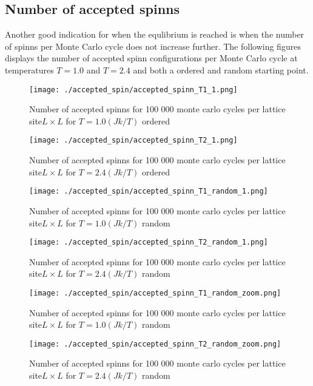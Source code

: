 \documentclass[../main.tex]{subfiles}
\begin{document}
\subsection*{Number of accepted spinns}
Another good indication for when the equlibrium is reached is when the number of spinns per Monte Carlo cycle does not increase further.  The following figures displays the number of accepted spinn configurations per Monte Carlo cycle at temperatures $T = 1.0$ and $T = 2.4$ and both a ordered and random starting point.

\begin{figure}[!ht]
  \centering
  \parbox{5cm}{
  \texttt{[image: ./accepted\_spin/accepted\_spinn\_T1\_1.png]}
  \caption{Number of accepted spinns for 100 000 monte carlo cycles per lattice site$L\times L$ for $T= 1.0(Jk/T)$ ordered}
  \label{fig:accepted_spinnT1}} 
  \qquad
  \begin{minipage}{5cm}
    \texttt{[image: ./accepted\_spin/accepted\_spinn\_T2\_1.png]}
    \caption{Number of accepted spinns for 100 000 monte carlo cycles per lattice site$L\times L$ for $T= 2.4(Jk/T)$ ordered}
    \label{fig:accepted_spinnT2}
  \end{minipage}
  \end{figure}
\FloatBarrier


\begin{figure}[!ht]
  \centering
  \parbox{5cm}{
  \texttt{[image: ./accepted\_spin/accepted\_spinn\_T1\_random\_1.png]}
  \caption{Number of accepted spinns for 100 000 monte carlo cycles per lattice site$L\times L$ for $T= 1.0(Jk/T)$ random}
  \label{fig:accepted_spinnT1_random}}
  \qquad
  \begin{minipage}{5cm}
    \texttt{[image: ./accepted\_spin/accepted\_spinn\_T2\_random\_1.png]}
    \caption{Number of accepted spinns for 100 000 monte carlo cycles per lattice site$L\times L$ for $T= 2.4(Jk/T)$ random}
    \label{fig:accepted_spinnT2_random}
  \end{minipage}
  \end{figure}
\FloatBarrier


\begin{figure}[!ht]
  \centering
  \parbox{5cm}{
  \texttt{[image: ./accepted\_spin/accepted\_spinn\_T1\_random\_zoom.png]}
  \caption{Number of accepted spinns for 100 000 monte carlo cycles per lattice site$L\times L$ for $T= 1.0(Jk/T)$ random}
  \label{fig:accepted_spinnT1_random_zoom}}
  \qquad
  \begin{minipage}{5cm}
    \texttt{[image: ./accepted\_spin/accepted\_spinn\_T2\_random\_zoom.png]}
    \caption{Number of accepted spinns for 100 000 monte carlo cycles per lattice site$L\times L$ for $T= 2.4(Jk/T)$ random}
    \label{fig:accepted_spinnT2_random_zoom}
  \end{minipage}
  \end{figure}
\FloatBarrier
\end{document}
